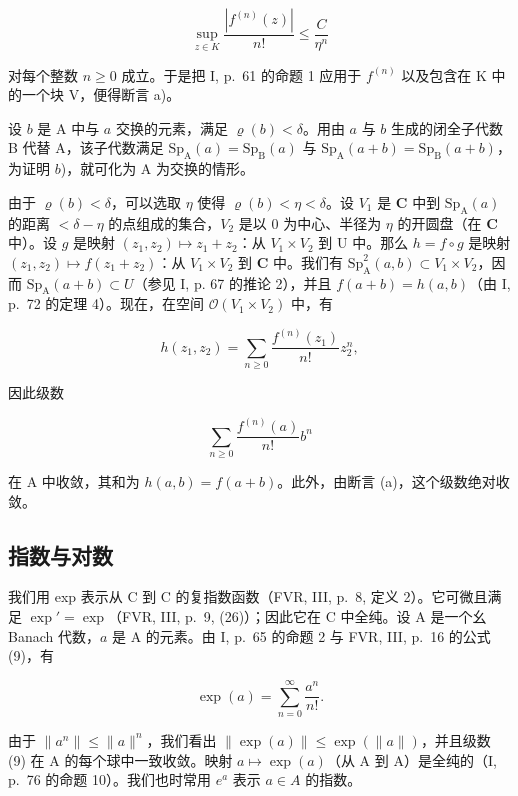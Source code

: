 \[
\sup _ {z \in K} \frac {| f ^ {(n)} (z) |}{n !} \leqslant \frac {C}{\eta^ {n}}
\]

对每个整数 \(n \geqslant 0\) 成立。于是把 I, p.~61 的命题 1 应用于 \(f^{(n)}\) 以及包含在 K 中的一个块 V，便得断言 a)。

设 \(b\) 是 A 中与 \(a\) 交换的元素，满足 \(\varrho(b) < \delta\)。用由 \(a\) 与 \(b\) 生成的闭全子代数 B 代替 A，该子代数满足 \(\mathrm{Sp}_{\mathrm{A}}(a) = \mathrm{Sp}_{\mathrm{B}}(a)\) 与 \(\mathrm{Sp}_{\mathrm{A}}(a + b) = \mathrm{Sp}_{\mathrm{B}}(a + b)\)，为证明 \(b\))，就可化为 A 为交换的情形。

由于 \(\varrho(b) < \delta\)，可以选取 \(\eta\) 使得 \(\varrho(b) < \eta < \delta\)。设 \(V_1\) 是 \(\mathbf{C}\) 中到 \(\mathrm{Sp}_{\mathrm{A}}(a)\) 的距离 \(< \delta - \eta\) 的点组成的集合，\(V_2\) 是以 0 为中心、半径为 \(\eta\) 的开圆盘（在 \(\mathbf{C}\) 中）。设 \(g\) 是映射 \((z_1, z_2) \mapsto z_1 + z_2\)：从 \(V_1 \times V_2\) 到 U 中。那么 \(h = f \circ g\) 是映射 \((z_1, z_2) \mapsto f(z_1 + z_2)\)：从 \(V_1 \times V_2\) 到 \(\mathbf{C}\) 中。我们有 \(\mathrm{Sp}_{\mathrm{A}}^{2}(a, b) \subset V_1 \times V_2\)，因而 \(\mathrm{Sp}_{\mathrm{A}}(a + b) \subset U\)（参见 I, p. 67 的推论 2），并且 \(f(a + b) = h(a, b)\)（由 I, p.~72 的定理 4）。现在，在空间 \(\mathcal{O}(V_1 \times V_2)\) 中，有

\[
h (z _ {1}, z _ {2}) = \sum_ {n \geqslant 0} \frac {f ^ {(n)} (z _ {1})}{n !} z _ {2} ^ {n},
\]

因此级数

\[
\sum_ {n \geqslant 0} \frac {f ^ {(n)} (a)}{n !} b ^ {n}
\]

在 A 中收敛，其和为 \(h(a,b)=f(a+b)\)。此外，由断言 (a)，这个级数绝对收敛。

\subsection{指数与对数}

我们用 exp 表示从 C 到 C 的复指数函数（FVR, III, p.~8, 定义 2）。它可微且满足 \(\exp' = \exp\)（FVR, III, p.~9, (26)）；因此它在 C 中全纯。设 A 是一个幺 Banach 代数，\(a\) 是 A 的元素。由 I, p.~65 的命题 2 与 FVR, III, p.~16 的公式 (9)，有

\[
\exp (a) = \sum_ {n = 0} ^ {\infty} \frac {a ^ {n}}{n !}.\tag{9}
\]

由于 \(\|a^{n}\|\leqslant\|a\|^{n}\)，我们看出 \(\|\exp(a)\|\leqslant\exp(\|a\|)\)，并且级数 (9) 在 A 的每个球中一致收敛。映射 \(a\mapsto\exp(a)\)（从 A 到 A）是全纯的（I, p.~76 的命题 10）。我们也时常用 \(e^{a}\) 表示 \(a\in A\) 的指数。

